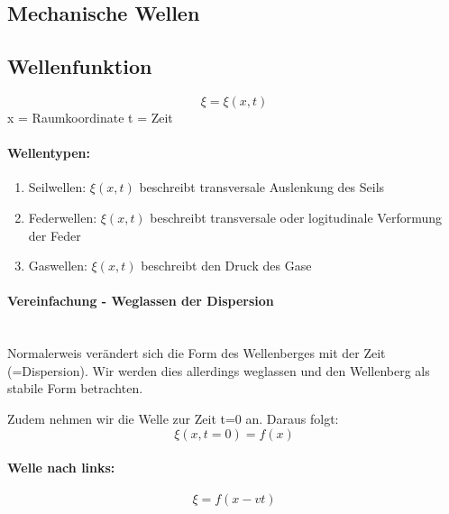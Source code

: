 \documentclass[7pt]{article}
\begin{document}
\begin{multicols*}{3}

\section{Mechanische Wellen}
\subsection{Wellenfunktion}
\begin{equation*}
  \xi = \xi(x,t)
\end{equation*}
x = Raumkoordinate\newline
t = Zeit\newline

\paragraph{Wellentypen:}
\begin{enumerate}
  \item Seilwellen: $\xi(x,t)$ beschreibt transversale Auslenkung des Seils
  \item Federwellen: $\xi(x,t)$ beschreibt transversale oder logitudinale Verformung der Feder
  \item Gaswellen: $\xi(x,t)$ beschreibt den Druck des Gase 
\end{enumerate}

\paragraph{Vereinfachung - Weglassen der Dispersion}\mbox{}\\
Normalerweis ver{\"a}ndert sich die Form des Wellenberges mit der Zeit (=Dispersion). Wir werden dies allerdings weglassen und den Wellenberg als stabile Form betrachten.

Zudem nehmen wir die Welle zur Zeit t=0 an. Daraus folgt:
\begin{equation*}
  \xi(x, t=0) = f(x)  
\end{equation*}
\paragraph{Welle nach links:}
\begin{equation*}
\xi = f(x-vt) 
\end{equation*}

\end{multicols*}
\end{document}
